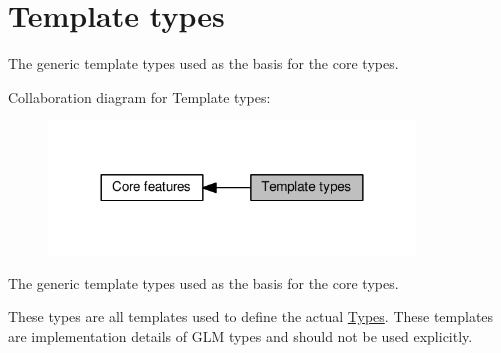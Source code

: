 \hypertarget{group__core__template}{}\section{Template types}
\label{group__core__template}


The generic template types used as the basis for the core types.  


Collaboration diagram for Template types\+:
\nopagebreak
\begin{figure}[H]
\begin{center}
\leavevmode
\includegraphics[width=276pt]{da/d97/group__core__template}
\end{center}
\end{figure}
The generic template types used as the basis for the core types. 

These types are all templates used to define the actual \hyperlink{group__core__types}{Types}. These templates are implementation details of G\+LM types and should not be used explicitly. 